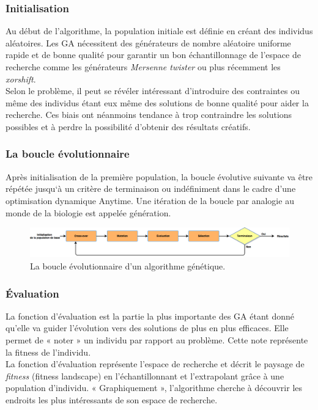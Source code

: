 \documentclass[french, 11pt]{memoir}
\begin{document}
\subsubsection{Initialisation}\label{initialisation}

Au début de l'algorithme, la population initiale est définie en créant
des individus aléatoires. Les GA nécessitent des générateurs de nombre
aléatoire uniforme rapide et de bonne qualité pour garantir un bon
échantillonnage de l'espace de recherche comme les générateurs
\emph{Mersenne twister} ou plus récemment les \emph{xorshift\cite{marsaglia2003xorshift}}. \\
Selon le problème, il peut se révéler intéressant d'introduire des
contraintes ou même des individus étant eux même des solutions de bonne
qualité pour aider la recherche. Ces biais ont néanmoins tendance à trop
contraindre les solutions possibles et à perdre la possibilité d'obtenir
des résultats créatifs.

\subsubsection{La boucle
évolutionnaire}\label{la-boucle-uxe9volutionnaire}

Après initialisation de la première population, la boucle évolutive
suivante va être répétée jusqu`à un critère de terminaison ou
indéfiniment dans le cadre d'une optimisation dynamique Anytime. Une
itération de la boucle par analogie au monde de la biologie est appelée
génération.

\begin{figure}[htbp]
	\begin{center}
		\includegraphics[width=6in]{img/gen_loop.png}
		\caption{La boucle évolutionnaire d'un algorithme génétique.}
	\end{center}
\end{figure}


\subsubsection{Évaluation}\label{uxe9valuation}

La fonction d'évaluation est la partie la plus importante des GA étant
donné qu'elle va guider l'évolution vers des solutions de plus en plus
efficaces. Elle permet de « noter » un individu par rapport au problème.
Cette note représente la fitness de l'individu. \\
La fonction d'évaluation représente l'espace de recherche et décrit le
paysage de \emph{fitness} (fitness landscape) en l'échantillonnant et
l'extrapolant grâce à une population d'individu. « Graphiquement »,
l'algorithme cherche à découvrir les endroits les plus intéressants de
son espace de recherche.
\end{document}

